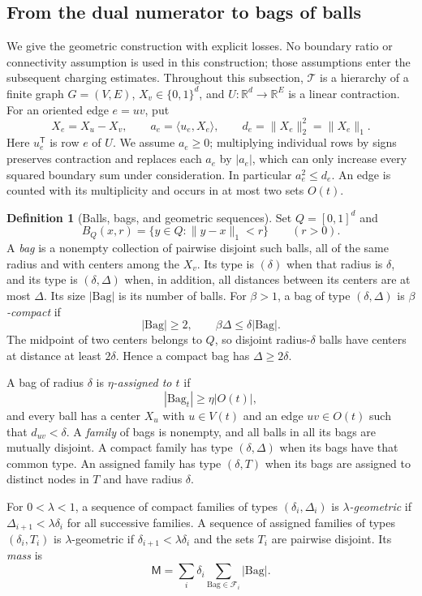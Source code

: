 \documentclass[11pt]{amsart}
\theoremstyle{definition}
\newtheorem{definition}[theorem]{Definition}
\theoremstyle{remark}
\numberwithin{equation}{section}
\begin{document}
\subsection{From the dual numerator to bags of balls}\label{hb:section}

We give the geometric construction with explicit losses.  No boundary
ratio or connectivity assumption is used in this construction; those
assumptions enter the subsequent charging estimates.  Throughout this
subsection, $\mathcal T$ is a hierarchy of a finite graph $G=(V,E)$,
$X_v\in\{0,1\}^d$, and $U:\mathbb R^d\to\mathbb R^E$ is a linear
contraction.  For an oriented edge $e=uv$, put
\[
 X_e=X_u-X_v,\qquad a_e=\langle u_e,X_e\rangle,\qquad
 d_e=\|X_e\|_2^2=\|X_e\|_1.
\]
Here $u_e^{\mathsf T}$ is row $e$ of $U$.  We assume $a_e\ge0$; multiplying individual
rows by signs preserves contraction and replaces each $a_e$ by $|a_e|$,
which can only increase every squared boundary sum under consideration.
In particular $a_e^2\le d_e$.  An edge is counted with its multiplicity
and occurs in at most two sets $O(t)$.

\begin{definition}[Balls, bags, and geometric sequences]\label{hb:definitions}
Set $Q=[0,1]^d$ and
\[
 B_Q(x,r)=\{y\in Q:\|y-x\|_1<r\}\qquad(r>0).
\]
A \emph{bag} is a nonempty collection of pairwise disjoint such balls,
all of the same radius and with centers among the $X_v$.  Its type is
$(\delta)$ when that radius is $\delta$, and its type is $(\delta,\Delta)$
when, in addition, all distances between its centers are at most
$\Delta$.  Its size $|\mathrm{Bag}|$ is its number of balls.
For $\beta>1$, a bag of type $(\delta,\Delta)$ is
\emph{$\beta$-compact} if
\[
 |\mathrm{Bag}|\ge2,\qquad
 \beta\Delta\le\delta|\mathrm{Bag}|.
\]
The midpoint of two centers belongs to $Q$, so disjoint radius-$\delta$
balls have centers at distance at least $2\delta$.  Hence a compact bag
has $\Delta\ge2\delta$.

A bag of radius $\delta$ is \emph{$\eta$-assigned to $t$} if
\[
 |\mathrm{Bag}_t|\ge\eta|O(t)|,
\]
and every ball has a center $X_u$ with $u\in V(t)$ and an edge
$uv\in O(t)$ such that $d_{uv}<\delta$.  A \emph{family} of bags is
nonempty, and all balls in all its bags are mutually disjoint.
A compact family has type $(\delta,\Delta)$ when its bags have that
common type.  An assigned family has type $(\delta,T)$ when its bags
are assigned to distinct nodes in $T$ and have radius $\delta$.

For $0<\lambda<1$, a sequence of compact families of types
$(\delta_i,\Delta_i)$ is \emph{$\lambda$-geometric} if
$\Delta_{i+1}<\lambda\delta_i$ for all successive families.
A sequence of assigned families of types $(\delta_i,T_i)$ is
$\lambda$-geometric if $\delta_{i+1}<\lambda\delta_i$ and the sets
$T_i$ are pairwise disjoint.  Its \emph{mass} is
\[
 \mathsf M=\sum_i\delta_i
       \sum_{\mathrm{Bag}\in\mathcal F_i}|\mathrm{Bag}|.
\]
\end{definition}
\end{document}
